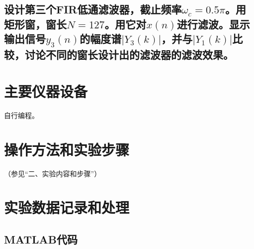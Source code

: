 \documentclass{../source/zjureport}
\begin{document}
        \subsection{设计第三个FIR低通滤波器，截止频率$\omega_c = 0.5\pi$。用矩形窗，窗长$N=127$。用它对$x(n)$进行滤波。显示输出信号$y_3(n)$的幅度谱$|Y_3(k)|$，并与$|Y_1(k)|$比较，讨论不同的窗长设计出的滤波器的滤波效果。}
    
    \section{主要仪器设备}
    自行编程。

    \section{操作方法和实验步骤}
    （参见“二、实验内容和步骤”）

    \section{实验数据记录和处理}
        \subsection{MATLAB代码}
            
\end{document}
